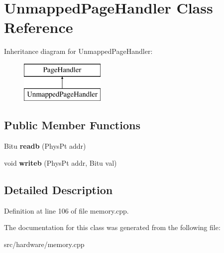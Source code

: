\hypertarget{classUnmappedPageHandler}{\section{Unmapped\-Page\-Handler Class Reference}
\label{classUnmappedPageHandler}
}
Inheritance diagram for Unmapped\-Page\-Handler\-:\begin{figure}[H]
\begin{center}
\leavevmode
\includegraphics[height=2.000000cm]{classUnmappedPageHandler}
\end{center}
\end{figure}
\subsection*{Public Member Functions}
\begin{DoxyCompactItemize}
\item 
\hypertarget{classUnmappedPageHandler_ae907b93df3e6a3de14944c0226017e03}{Bitu {\bfseries readb} (Phys\-Pt addr)}\label{classUnmappedPageHandler_ae907b93df3e6a3de14944c0226017e03}

\item 
\hypertarget{classUnmappedPageHandler_a9158fb668304825dc4f78adb47666a74}{void {\bfseries writeb} (Phys\-Pt addr, Bitu val)}\label{classUnmappedPageHandler_a9158fb668304825dc4f78adb47666a74}

\end{DoxyCompactItemize}


\subsection{Detailed Description}


Definition at line 106 of file memory.\-cpp.



The documentation for this class was generated from the following file\-:\begin{DoxyCompactItemize}
\item 
src/hardware/memory.\-cpp\end{DoxyCompactItemize}
